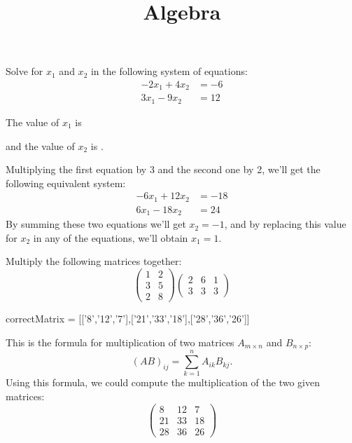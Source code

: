 \documentclass{ximera}
\title{Algebra}
\begin{document}
\maketitle

\begin{question}
Solve for $x_1$ and $x_2$ in the following system of equations:
\begin{align*}
-2x_1 + 4x_2 &= -6\\
3x_1  - 9x_2 &=  12 
\end{align*}
\begin{solution}
The value of $x_1$ is 
\end{solution}
\begin{solution}
and the value of $x_2$ is .
\end{solution}
Multiplying the first equation by 3 and the second one by 2, we'll get the following equivalent system:
\begin{align*}
 -6  x_1  + 12  x_2 &= -18 \\
 6  x_1  - 18  x_2 &= 24
\end{align*}
By summing these two equations we'll get $x_2 = -1$, and by replacing
this value for $x_2$ in any of the equations, we'll obtain $x_1 = 1$.
\end{question}

\begin{question}
Multiply the following matrices together:
\[ 
\left( \begin{array}{cc}
1 & 2 \\
3 & 5 \\
2 & 8
\end{array} \right)
\left( \begin{array}{ccc}
2 & 6 & 1 \\
3 & 3 & 3
\end{array} \right)
\]
\begin{solution}
\begin{matrix-answer}[name=M]
    correctMatrix = [['8','12','7'],['21','33','18'],['28','36','26']]
\end{matrix-answer}
\end{solution}
This is the formula for multiplication of two matrices $A_{m \times n}$ and $B_{n \times p}$:
\[
    (AB)_{ij} = \sum_{k=1}^n A_{ik}B_{kj}. 
\]
Using this formula, we could compute the multiplication of the two given matrices:
\[
\begin{pmatrix}
8 & 12 & 7 \\
21 & 33 & 18 \\
28 & 36 & 26
\end{pmatrix}
\]
\end{question}
\end{document}
